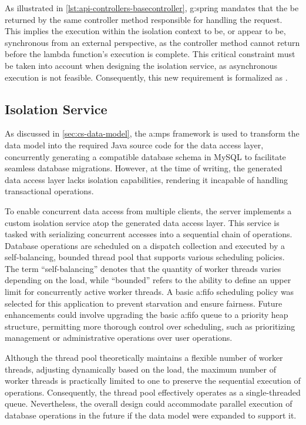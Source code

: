 As illustrated in \cref{lst:api-controllers-basecontroller}, \gls{g:spring} mandates that the  be returned by the same controller method responsible for handling the request. This implies the execution within the isolation context to be, or appear to be, synchronous from an external perspective, as the controller method cannot return before the lambda function's execution is complete. This critical constraint must be taken into account when designing the isolation service, as asynchronous execution is not feasible. Consequently, this new requirement is formalized as \requirementdef\label{req:synchronous-isolation}.

\pagebreak

\subsection{Isolation Service}\label{sec:cs-isolation}

As discussed in \cref{sec:cs-data-model}, the \gls{a:mps} framework is used to transform the data model into the required Java source code for the data access layer, concurrently generating a compatible database schema in MySQL to facilitate seamless database migrations. However, at the time of writing, the generated data access layer lacks isolation capabilities, rendering it incapable of handling transactional operations.

To enable concurrent data access from multiple clients, the server implements a custom isolation service atop the generated data access layer. This service is tasked with serializing concurrent accesses into a sequential chain of operations. Database operations are scheduled on a dispatch collection and executed by a self-balancing, bounded thread pool that supports various scheduling policies. The term \enquote{self-balancing} denotes that the quantity of worker threads varies depending on the load, while \enquote{bounded} refers to the ability to define an upper limit for concurrently active worker threads. A basic \gls{a:fifo} scheduling policy was selected for this application to prevent starvation and ensure fairness. Future enhancements could involve upgrading the basic \gls{a:fifo} queue to a priority heap structure, permitting more thorough control over scheduling, such as prioritizing management or administrative operations over user operations.

Although the thread pool theoretically maintains a flexible number of worker threads, adjusting dynamically based on the load, the maximum number of worker threads is practically limited to one to preserve the sequential execution of operations. Consequently, the thread pool effectively operates as a single-threaded queue. Nevertheless, the overall design could accommodate parallel execution of database operations in the future if the data model were expanded to support it.

